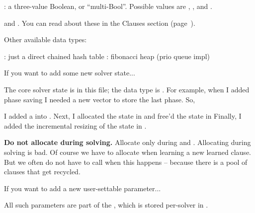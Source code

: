\li {}: a three-value Boolean, or ``multi-Bool''. Possible values
are
, , and .

\li {} and . You can read about these
in the Clauses
section (page~).


\endunorderedlist

Other available data types:
\unorderedlist

\li {}: just a direct chained hash table
\li {}: fibonacci heap (prio queue impl)

\endunorderedlist

\fi

If you want to add some new solver state...

The core solver state is in this file; the data type is . For
example,
when I added phase saving I needed a new vector to store the last phase. So,

\unorderedlist
\li I added a  into .
\li Next, I allocated the state in 
\li and free'd the state in 
\li Finally, I added the incremental resizing of the state
in .

\endunorderedlist

{\bf Do not allocate during solving.} Allocate only during 
and
. Allocating during solving is bad. Of course we have to
allocate
when learning a new learned clause. But we often do not have to call 
when this happens -- because there is a pool of clauses that get recycled.

\fi

If you want to add a new user-settable parameter...

All such parameters are part of the , which is stored
per-solver in .

\fi

